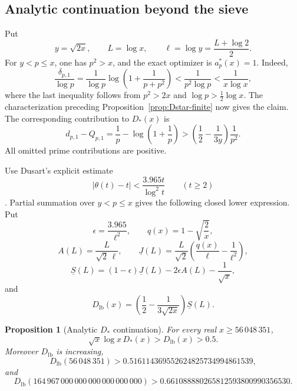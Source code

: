 \documentclass[11pt,a4paper]{article}
\numberwithin{equation}{section}
\newtheorem{proposition}[theorem]{Proposition}
\theoremstyle{definition}
\newcommand{\Xdirect}{56\,048\,351}
\newcommand{\Xmax}{164\,967\,000\,000\,000\,000\,000\,000}
\begin{document}
\subsection{Analytic continuation beyond the sieve}

Put
\[
  y=\sqrt{2x},\qquad
  L=\log x,\qquad
  \ell=\log y=\frac{L+\log2}{2}.
\]
For \(y<p\le x\), one has \(p^2>x\), and the exact optimizer is
\(a_p^*(x)=1\).  Indeed,
\[
  \frac{\delta_{p,1}}{\log p}
  =
  \frac1{\log p}\log\left(1+\frac1{p+p^2}\right)
  <
  \frac1{p^2\log p}
  <
  \frac1{x\log x},
\]
where the last inequality follows from \(p^2>2x\) and
\(\log p>\tfrac12\log x\).  The characterization preceding
Proposition~\ref{prop:Dstar-finite} now gives the claim.  The corresponding
contribution to \(D_*(x)\) is
\[
  d_{p,1}-Q_{p,1}
  =
  \frac1p-\log\left(1+\frac1p\right)
  >
  \left(\frac12-\frac1{3y}\right)\frac1{p^2}.
\]
All omitted prime contributions are positive.

Use Dusart's explicit estimate
\begin{equation}\label{eq:dusart-theta}
  |\theta(t)-t|<\frac{3.965t}{\log^2t}
  \qquad(t\ge2)
\end{equation}
\cite{dusarttheta1999}.  Partial summation over \(y<p\le x\) gives the
following closed lower expression.  Put
\[
  \epsilon=\frac{3.965}{\ell^2},
  \qquad
  q(x)=1-\sqrt{\frac2x},
\]
\[
  A(L)=\frac{L}{\sqrt2\,\ell},
  \qquad
  \underline J(L)
  =
  \frac{L}{\sqrt2}
  \left(\frac{q(x)}\ell-\frac1{\ell^2}\right),
\]
\[
  \underline S(L)
  =
  (1-\epsilon)\underline J(L)
  -2\epsilon A(L)-\frac1{\sqrt x},
\]
and
\[
  D_{\mathrm{lb}}(x)
  =
  \left(\frac12-\frac1{3\sqrt{2x}}\right)\underline S(L).
\]

\begin{proposition}[Analytic \(D_*\) continuation]\label{prop:Dstar-analytic}
For every real \(x\ge\Xdirect\),
\[
  \sqrt{x}\log x\,D_*(x)>D_{\mathrm{lb}}(x)>0.5.
\]
Moreover \(D_{\mathrm{lb}}\) is increasing,
\[
  D_{\mathrm{lb}}(\Xdirect)
  >
  0.516114369552624825734994861539,
\]
and
\[
  D_{\mathrm{lb}}(\Xmax)
  >
  0.661088880265812593800990356530.
\]
\end{proposition}
\end{document}
